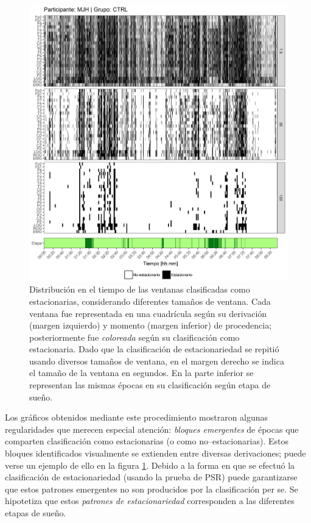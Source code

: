 \documentclass[12pt,letterpaper]{book}
\begin{document}
\begin{figure}
\centering
\includegraphics[width=\linewidth]
{./scripts_graf_res/MJNNVIGILOS_patrones_show.png}
\caption[Distribución en el tiempo de las ventanas clasificadas como estacionarias, considerando diferentes tamaños de ventana]{Distribución en el tiempo de las ventanas clasificadas como estacionarias, considerando diferentes tamaños de ventana. 
Cada ventana fue representada en una cuadrícula según su derivación (margen izquierdo) y momento (margen inferior) de procedencia; posteriormente fue \textit{coloreada} según su clasificación como estacionaria.
Dado que la clasificación de estacionariedad se repitió usando diversos tamaños de ventana, en el margen derecho se indica el tamaño de la ventana en segundos.
En la parte inferior se representan las mismas épocas en su clasificación según etapa de sueño.
}
\label{img:patrones}
\end{figure}

Los gráficos obtenidos mediante este procedimiento mostraron algunas regularidades que merecen especial atención: \textit{bloques emergentes} de épocas que comparten clasificación como estacionarias (o como no--estacionarias).
%
Estos bloques identificados visualmente se extienden entre diversas derivaciones; puede verse un ejemplo de ello en la figura \ref{img:patrones}.
%
Debido a la forma en que se efectuó la clasificación de estacionariedad (usando la prueba de PSR) puede garantizarse que estos patrones emergentes no son producidos por la clasificación per se.
%
Se hipotetiza que estos \textit{patrones de estacionariedad}
corresponden a las diferentes etapas de sueño.
\end{document}

